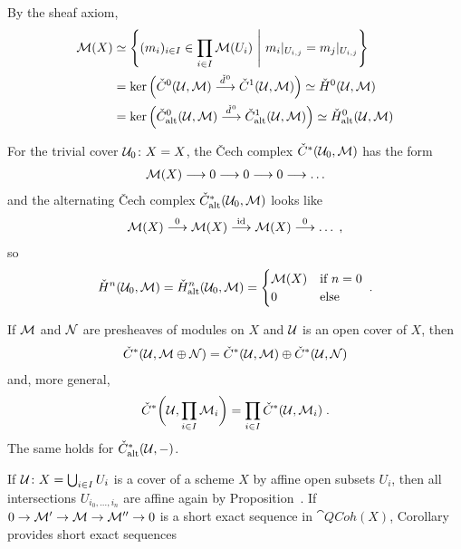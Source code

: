 \documentclass[a4paper,parskip=half,numbers=enddot, DIV=12]{scrreprt}
\newcommand{\vC}{\v{C}}
\begin{document}
\begin{example}
	\begin{alphanumerate}
		\item {}By the sheaf axiom, 
		\begin{align*}
			\Mm(X)&\simeq\left\{(m_i)_{i\in I}\in\prod_{i\in I}\Mm(U_i)\st m_i|_{U_{i,j}}=m_j|_{U_{i,j}}\right\}\\
			&=\ker\Big(\check{C}^0(\Uu,\Mm)\morphism[\hacek{d}^0]\check{C}^1(\Uu,\Mm)\Big)\simeq \check{H}^0(\Uu,\Mm)\\
			&=\ker\Big(\check{C}_\alt^0(\Uu,\Mm)\morphism[\hacek{d}^0]\check{C}_\alt^1(\Uu,\Mm)\Big)\simeq \check{H}_\alt^0(\Uu,\Mm)
		\end{align*}
		\item For the trivial cover $\mathcal{U}_0\colon X=X$, the \vC ech complex $\check{C}^*(\mathcal{U}_0,\mathcal{M})$ has the form
		\begin{align*}
			\Mm(X)\morphism 0\morphism 0\morphism0\morphism\ldots
		\end{align*}
		and the alternating \vC ech complex $\check{C}_{\mathrm{alt}}^*(\mathcal{U}_0,\mathcal{M})$ looks like
		\begin{align*}
			\Mm(X)\morphism[0]\Mm(X)\morphism[\id]\Mm(X)\morphism[0]\ldots\;,
		\end{align*}
		so
		\begin{align*}
			\check{H}^n(\mathcal{U}_0,\mathcal{M})=\check{H}_{\mathrm{alt}}^n(\mathcal{U}_0,\mathcal{M})=\begin{cases}
				\mathcal{M}(X) & \text{if }n=0\\
				0 & \text{else}
			\end{cases}\;.
		\end{align*}
		\item If $\mathcal{M}$ and $\mathcal{N}$ are presheaves of modules on $X$ and $\mathcal{U}$ is an open cover of $X$, then 
		\begin{align*}
			\check{C}^*(\mathcal{U},\mathcal{M}\oplus\mathcal{N})=\check{C}^*(\mathcal{U},\mathcal{M})\oplus\check{C}^*(\mathcal{U},\mathcal{N})
		\end{align*}
		and, more general, 
		\begin{align*}
			\check{C}^*\bigg(\mathcal{U},\prod_{i\in I}\mathcal{M}_i\bigg)=\prod_{i\in I}\check{C}^*(\mathcal{U},\mathcal{M}_i)\;.
		\end{align*}
		The same holds for $\check{C}_{\mathrm{alt}}^*(\mathcal{U},-)$.
	\end{alphanumerate}
\end{example}
If $\mathcal{U}\colon X=\bigcup_{i\in I}U_i$ is a cover of a scheme $X$ by affine open subsets $U_i$, then all intersections $U_{i_0,\ldots,i_n}$ are affine again by Proposition~. If $0\morphism\Mm'\morphism\Mm\morphism\Mm''\morphism 0$ is a short exact sequence in $\cat{QCoh}(X)$, Corollary~ provides short exact sequences
\end{document}

